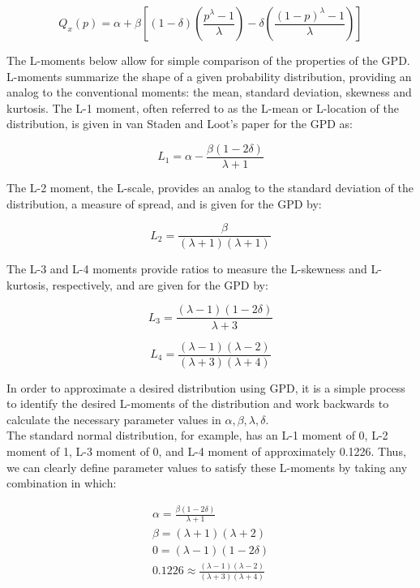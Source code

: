 \documentclass[12pt]{article}
\begin{document}
\begin{equation}
Q_x(p)=\alpha+\beta[(1-\delta)(\frac{p^\lambda-1}{\lambda})-\delta(\frac{(1-p)^\lambda-1}{\lambda})]\label{eq10}
\end{equation}

The L-moments below allow for simple comparison of the properties of the GPD. L-moments summarize the shape of a given probability distribution, providing an analog to the conventional moments: the mean, standard deviation, skewness and kurtosis. The L-1 moment, often referred to as the L-mean or L-location of the distribution, is given in van Staden and Loot's paper for the GPD as:

\begin{equation}
L_1=\alpha-\frac{\beta(1-2\delta)}{\lambda+1}\label{eq11}
\end{equation}

The L-2 moment, the L-scale, provides an analog to the standard deviation of the distribution, a measure of spread, and is given for the GPD by:

\begin{equation}
L_2=\frac{\beta}{(\lambda+1)(\lambda+1)}\label{eq12}
\end{equation}

The L-3 and L-4 moments provide ratios to measure the L-skewness and L-kurtosis, respectively, and are given for the GPD by:

\begin{equation}
L_3=\frac{(\lambda - 1)(1-2 \delta)}{\lambda + 3}\label{eq13}
\end{equation}

\begin{equation}
L_4=\frac{(\lambda-1)(\lambda-2)}{(\lambda+3)(\lambda+4)}\label{eq14}
\end{equation}

In order to approximate a desired distribution using GPD, it is a simple process to identify the desired L-moments of the distribution and work backwards to calculate the necessary parameter values in $\alpha,\beta,\lambda,\delta$. \\

The standard normal distribution, for example, has an L-1 moment of 0, L-2 moment of 1, L-3 moment of 0, and L-4 moment of approximately 0.1226. Thus, we can clearly define parameter values to satisfy these L-moments by taking any combination in which:

\begin{eqnarray*}
\alpha=\frac{\beta(1-2\delta)}{\lambda+1}\\[10px]
\beta=(\lambda+1)(\lambda+2)\\[10px]
0=(\lambda-1)(1-2\delta)\\[10px]
0.1226 \approx \frac{(\lambda-1)(\lambda-2)}{(\lambda+3)(\lambda+4)}
\end{eqnarray*}
\end{document}
